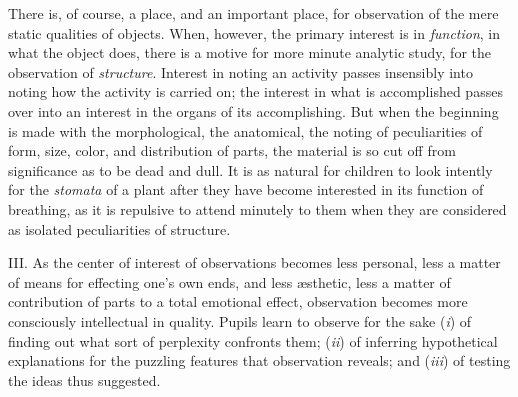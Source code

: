 \documentclass[showtrims,ustradepaper]{memoir}
\begin{document}
There is, of course, a place, and an important place, for observation of
the mere static qualities of objects. When, however, the primary
interest is in \emph{function}, in what the object does, there is a
motive for more minute analytic study, for the observation of
\emph{structure}. Interest in noting an activity passes insensibly into
noting how the activity is carried on; the interest in what is
accomplished passes over into an interest in the organs of its
accomplishing. But when the beginning is made with the morphological,
the anatomical, the noting of peculiarities of form, size, color, and
distribution of parts, the material is so cut off from significance as
to be dead and dull. It is as natural for children to look intently for
the \emph{stomata} of a plant after they have become interested in its
function of breathing, as it is repulsive to attend minutely to them
when they are considered as isolated peculiarities of
structure.


III. As the center of interest of observations becomes less personal,
less a matter of means for effecting one's own ends, and less æsthetic,
less a matter of contribution of parts to a total emotional effect,
observation becomes more consciously intellectual in quality. Pupils
learn to observe for the sake (\emph{i}) of finding out what sort of
perplexity confronts them; (\emph{ii}) of inferring hypothetical
explanations for the puzzling features that observation reveals; and
(\emph{iii}) of testing the ideas thus suggested.


\end{document}
